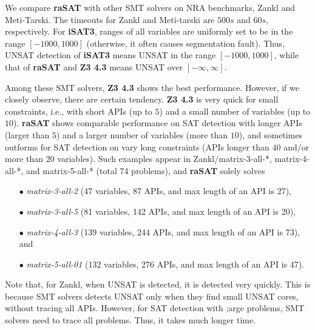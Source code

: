 We compare {\bf raSAT} with other SMT solvers on NRA benchmarks, Zankl and Meti-Tarski. 
The timeouts for Zankl and Meti-tarski are $500s$ and $60s$, respectively. 
For {\bf iSAT3}, ranges of all variables are uniformly set to be in the range $[-1000, 1000]$
(otherwise, it often causes segmentation fault). 
Thus, UNSAT detection of {\bf iSAT3} means UNSAT in the range $[-1000, 1000]$, 
while that of {\bf raSAT} and {\bf Z3 4.3} means  UNSAT over $[-\infty, \infty]$. 

Among these SMT solvers, {\bf Z3 4.3} shows the best performance. 
However, if we closely observe, there are certain tendency. 
{\bf Z3 4.3} is very quick for small constraints, i.e., with 
short APIs (up to $5$) and a small number of variables (up to $10$). 
{\bf raSAT} shows comparable performance on SAT detection with 
longer APIs (larger than $5$) and a larger number of variables (more than $10$), 
and sometimes outforms for SAT detection on vary long constraints 
(APIs longer than $40$ and/or more than $20$ variables). 
Such examples appear in Zankl/matrix-3-all-*, matrix-4-all-*, and matrix-5-all-* 
(total 74 problems), and {\bf raSAT} solely solves 
\begin{itemize}
\item[$\bullet$] {\em matrix-3-all-2} (47 variables, 87 APIs, and max length of an API is 27), 
\item[$\bullet$] {\em matrix-3-all-5} (81 variables, 142 APIs, and max length of an API is 20), 
\item[$\bullet$] {\em matrix-4-all-3} (139 variables, 244 APIs, and max length of an API is 73), and 
\item[$\bullet$] {\em matrix-5-all-01} (132 variables, 276 APIs, and max length of an API is 47). 
\end{itemize}
Note that, for Zankl, when UNSAT is detected, it is detected very quickly. 
This is because SMT solvers detects UNSAT only when they find small UNSAT cores, 
without tracing all APIs. However, for SAT detection with ;arge problems, 
SMT solvers need to trace all problems. Thus, it takes much longer time. 

